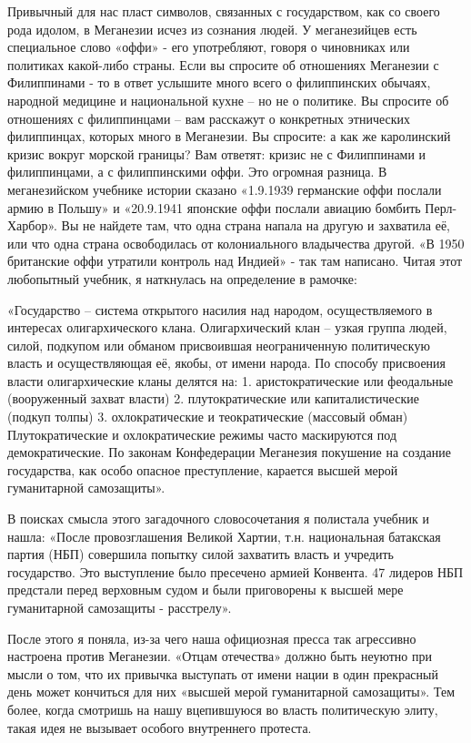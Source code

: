 \documentclass[10pt,final]{book}
\begin{document}
Привычный для нас пласт символов, связанных с государством, как со своего рода идолом, в Меганезии исчез из сознания людей. У меганезийцев есть специальное слово «оффи» - его употребляют, говоря о чиновниках или политиках какой-либо страны. Если вы спросите об отношениях Меганезии с Филиппинами - то в ответ услышите много всего о филиппинских обычаях, народной медицине и национальной кухне -- но не о политике. Вы спросите об отношениях с филиппинцами -- вам расскажут о конкретных этнических филиппинцах, которых много в Меганезии. Вы спросите: а как же каролинский кризис вокруг морской границы? Вам ответят: кризис не с Филиппинами и филиппинцами, а с филиппинскими оффи. Это огромная разница. В меганезийском учебнике истории сказано «1.9.1939 германские оффи послали армию в Польшу» и «20.9.1941 японские оффи послали авиацию бомбить Перл-Харбор». Вы не найдете там, что одна страна напала на другую и захватила её, или что одна страна освободилась от колониального владычества другой. «В 1950 британские оффи утратили контроль над Индией» - так там написано. Читая этот любопытный учебник, я наткнулась на определение в рамочке:

«Государство -- система открытого насилия над народом, осуществляемого в интересах олигархического клана. Олигархический клан -- узкая группа людей, силой, подкупом или обманом присвоившая неограниченную политическую власть и осуществляющая её, якобы, от имени народа. По способу присвоения власти олигархические кланы делятся на:
1. аристократические или феодальные (вооруженный захват власти)
2. плутократические или капиталистические (подкуп толпы)
3. охлократические и теократические (массовый обман)
Плутократические и охлократические режимы часто маскируются под демократические. По законам Конфедерации Меганезия покушение на создание государства, как особо опасное преступление, карается высшей мерой гуманитарной самозащиты».
 
В поисках смысла этого загадочного словосочетания я полистала учебник и нашла: «После провозглашения Великой Хартии, т.н. национальная батакская партия (НБП) совершила попытку силой захватить власть и учредить государство. Это выступление было пресечено армией Конвента. 47 лидеров НБП предстали перед верховным судом и были приговорены к высшей мере гуманитарной самозащиты - расстрелу».

После этого я поняла, из-за чего наша официозная пресса так агрессивно настроена против Меганезии. «Отцам отечества» должно быть неуютно при мысли о том, что их привычка выступать от имени нации в один прекрасный день может кончиться для них «высшей мерой гуманитарной самозащиты». Тем более, когда смотришь на нашу вцепившуюся во власть политическую элиту, такая идея не вызывает особого внутреннего протеста.
\end{document}

